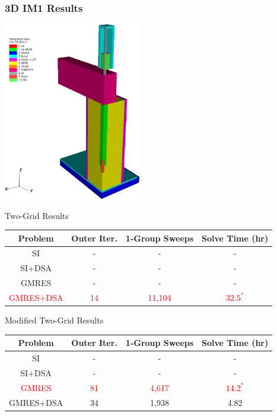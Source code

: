 \documentclass[compress,10pt]{beamer}
\newcommand{\tcr}[1]{\textcolor{red}{#1}}
\begin{document}
\begin{frame}[t]\frametitle{\small 3D IM1 Results}{\footnotesize
{}
{
\hspace*{1.75cm}
\centering
{}\includegraphics[width=0.45\textwidth]{images/IM1_configuration_Rev1.png}
}
{
\vspace{-2mm}
\begin{block}{Two-Grid Results}
\begin{table}
\begin{tabular}{|c|c|c|c|}
\hline
Problem & Outer Iter.  & 1-Group Sweeps & Solve Time (hr)  \\
\hline \hline
SI & - & -  & -  \\ \hline
SI+DSA & -  & - & -  \\ \hline
GMRES & -  & - & - \\ \hline
\tcr{GMRES+DSA} & \tcr{14} &  \tcr{11,104}  &  \tcr{$32.5^*$}  \\ \hline
\end{tabular}
\end{table}
\end{block}
\vspace{-2mm}
\begin{block}{Modified Two-Grid Results}
\begin{table}
\begin{tabular}{|c|c|c|c|}
\hline
Problem & Outer Iter.  & 1-Group Sweeps & Solve Time (hr)  \\
\hline \hline
SI & - &  - & -  \\ \hline
SI+DSA & -  & - & -  \\ \hline
\tcr{GMRES} & \tcr{81}  & \tcr{4,617 }& \tcr{$14.2^*$} \\ \hline
GMRES+DSA & 34 &  1,938  &  4.82  \\ \hline

\end{tabular}
\end{table}
\end{block}}}
\end{frame}
\end{document}
